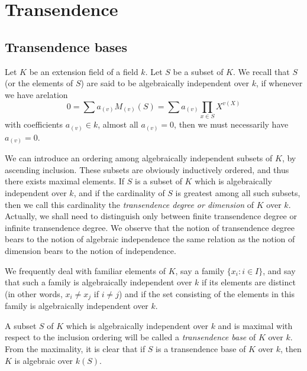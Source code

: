 \section{Transendence}
\subsection{Transendence bases}
Let \(K\) be an extension field of a field \(k\). Let \(S\) be a subset of
\(K\). We recall that \(S\) (or the elements of \(S\)) are said to be
algebraically independent over \(k\), if whenever we have arelation
\[
  0=\sum a_{(v)}M_{(v)}(S)=\sum a_{(v)}\prod_{x\in S}X^{v(X)}
\]
with coefficients \(a_{(v)}\in k\), almost all \(a_{(v)}=0\), then we must
necessarily have \(a_{(v)}=0\).

We can introduce an ordering among algebraically independent subsets of
\(K\), by ascending inclusion. These subsets are obviously inductively
ordered, and thus there exists maximal elements. If \(S\) is a subset of
\(K\) which is algebraically independent over \(k\), and if the cardinality
of \(S\) is greatest among all such subsets, then we call this cardinality
the \emph{transendence degree or dimension} of \(K\) over \(k\). Actually,
we shall need to distinguish only between finite transendence degree or
infinite transendence degree. We observe that the notion of transendence
degree bears to the notion of algebraic independence the same relation as
the notion of dimension bears to the notion of independence.

We frequently deal with familiar elements of \(K\), say a family
\(\{x_i:i\in I\}\), and say that such a family is algebraically independent
over \(k\) if its elements are distinct (in other words, \(x_i\neq x_j\) if
\(i\neq j\)) and if the set consisting of the elements in this family is
algebraically independent over \(k\).

A subset \(S\) of \(K\) which is algebraically independent over \(k\) and
is maximal with respect to the inclusion ordering will be called a
\emph{transendence base} of \(K\) over \(k\). From the maximality, it is
clear that if \(S\) is a transendence base of \(K\) over \(k\), then \(K\)
is algebraic over \(k(S)\).

